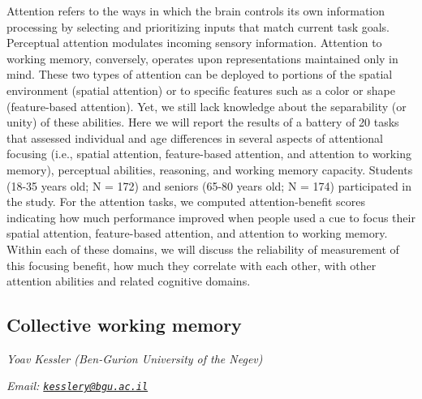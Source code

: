 \documentclass[12pt,]{book}
\begin{document}
Attention refers to the ways in which the brain controls its own information processing by selecting and prioritizing inputs that match current task goals. Perceptual attention modulates incoming sensory information. Attention to working memory, conversely, operates upon representations maintained only in mind. These two types of attention can be deployed to portions of the spatial environment (spatial attention) or to specific features such as a color or shape (feature-based attention). Yet, we still lack knowledge about the separability (or unity) of these abilities. Here we will report the results of a battery of 20 tasks that assessed individual and age differences in several aspects of attentional focusing (i.e., spatial attention, feature-based attention, and attention to working memory), perceptual abilities, reasoning, and working memory capacity. Students (18-35 years old; N = 172) and seniors (65-80 years old; N = 174) participated in the study. For the attention tasks, we computed attention-benefit scores indicating how much performance improved when people used a cue to focus their spatial attention, feature-based attention, and attention to working memory. Within each of these domains, we will discuss the reliability of measurement of this focusing benefit, how much they correlate with each other, with other attention abilities and related cognitive domains.

\hypertarget{collective-working-memory}{%
\subsection{Collective working memory}\label{collective-working-memory}}

\emph{Yoav Kessler (Ben-Gurion University of the Negev)}

\emph{Email: \href{mailto:kesslery@bgu.ac.il}{\nolinkurl{kesslery@bgu.ac.il}}}
\end{document}

